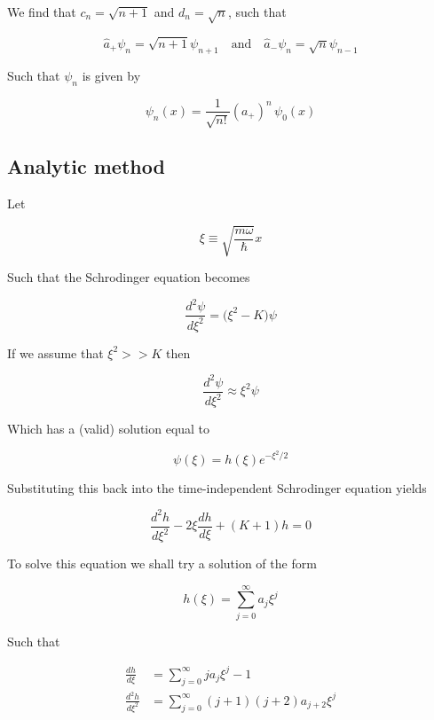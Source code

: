 \documentclass[a4paper]{article}
\begin{document}
We find that $c_n=\sqrt{n+1}$ and $d_n=\sqrt{n}$, such that

\begin{equation}
	\hat{a}_+\psi_n=\sqrt{n+1}\psi_{n+1}\quad\text{and}\quad\hat{a}_-\psi_n=\sqrt{n}\psi_{n-1}
\end{equation}

Such that $\psi_n$ is given by

\begin{equation}
	\psi_n(x)=\frac{1}{\sqrt{n!}}(a_+)^n\,\psi_0(x)
\end{equation}

\subsection{Analytic method}

Let

\begin{equation}
	\xi\equiv\sqrt{\frac{m\omega}{\hbar}}x
\end{equation}

Such that the Schrodinger equation becomes

\begin{equation}
	\frac{d^2\psi}{d\xi^2}=\big(\xi^2-K\big)\psi
\end{equation}

If we assume that $\xi^2>>K$ then

\begin{equation}
	\frac{d^2\psi}{d\xi^2}\approx\xi^2\psi
\end{equation}

Which has a (valid) solution equal to

\begin{equation}
	\psi(\xi)=h(\xi)e^{-\xi^2/2}
\end{equation} 

Substituting this back into the time-independent Schrodinger equation yields

\begin{equation}
\frac{d^2h}{d\xi^2}-2\xi\frac{dh}{d\xi}+(K+1)h=0
\end{equation}

To solve this equation we shall try a solution of the form

\begin{equation}
	h(\xi)=\sum_{j=0}^{\infty}a_j\xi^j
\end{equation}

Such that

\begin{align}
	\frac{dh}{d\xi}&=\sum_{j=0}^{\infty}ja_j\xi^j-1\\[0.5em]
	\frac{d^2h}{d\xi^2}&=\sum_{j=0}^{\infty}(j+1)(j+2)a_{j+2}\xi^j
\end{align}
\end{document}

